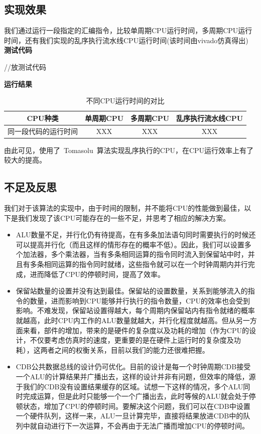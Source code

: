\documentclass[twoside]{article}
\begin{document}
\subsection{实现效果}
我们通过运行一段指定的汇编指令，比较单周期CPU运行时间，多周期CPU运行时间，还有我们实现的乱序执行流水线CPU运行时间(该时间由vivado仿真得出)\\
\textbf{测试代码}
\begin{verilogcode}
//放测试代码
\end{verilogcode}
\textbf{运行结果}
\begin{table}[htp]
    \caption{不同CPU运行时间的对比}
    \centering
    \begin{tabular}{cccc}
        \toprule
        CPU种类 & 单周期CPU & 多周期CPU & 乱序执行流水线CPU \\ 
        \midrule
        同一段代码的运行时间 & XXX & XXX & XXX \\
        \bottomrule
    \end{tabular}
    \label{tab:timediff}    
\end{table}
由此可见，使用了~Tomasolu~算法实现乱序执行的CPU，在CPU运行效率上有了较大的提高。
\subsection{不足及反思}
我们对于该算法的实现中，由于时间的限制，并不能将CPU的性能做到最佳，以下是我们发现了该CPU可能存在的一些不足，并思考了相应的解决方案。
\begin{itemize}
    \item ALU数量不足，并行化仍有待提高，在有多条加法语句同时需要执行的时候还可以提高并行化（而且这样的情形存在的概率不低）。因此，我们可以设置多个加法器，多个乘法器，当有多条相同运算的指令同时流入到保留站中时，并且有多条相同运算的指令同时就绪，这些指令就可以在一个时钟周期内并行完成，进而降低了CPU的停顿时间，提高了效率。
    \item 保留站数量的设置并没有达到最佳。保留站的设置数量，关系到能够流入的指令的数量，进而影响到CPU能够并行执行的指令数量，CPU的效率也会受到影响。不难发现，保留站设置得越大，每个周期内保留站内有指令就绪的概率就越高，此时CPU内工作的ALU数量就越大，并行化程度就越高。但从另一方面来看，部件的增加，带来的是硬件的复杂度以及功耗的增加（作为CPU的设计，不仅要考虑仿真时的速度，更重要的是在硬件上运行时的复杂度及功耗），这两者之间的权衡关系，目前以我们的能力还很难把握。
    \item CDB公共数据总线的设计仍可优化。目前的设计是每一个时钟周期CDB接受一个ALU的计算结果并广播出去，这样的设计并非有问题，但效率的降低，源于我们的CDB没有设置结果缓存的区域。试想一下这样的情况，多个ALU同时完成运算，但是此时只能够一个一个广播出去，此时等候的ALU就会处于停顿状态，增加了CPU的停顿时间。要解决这个问题，我们可以在CDB中设置一个硬件队列，这样一来，ALU一旦计算完毕，直接将结果放进CDB中的队列中就自动进行下一次运算，不会再由于无法广播而增加CPU的停顿时间。
\end{itemize}
\end{document}
